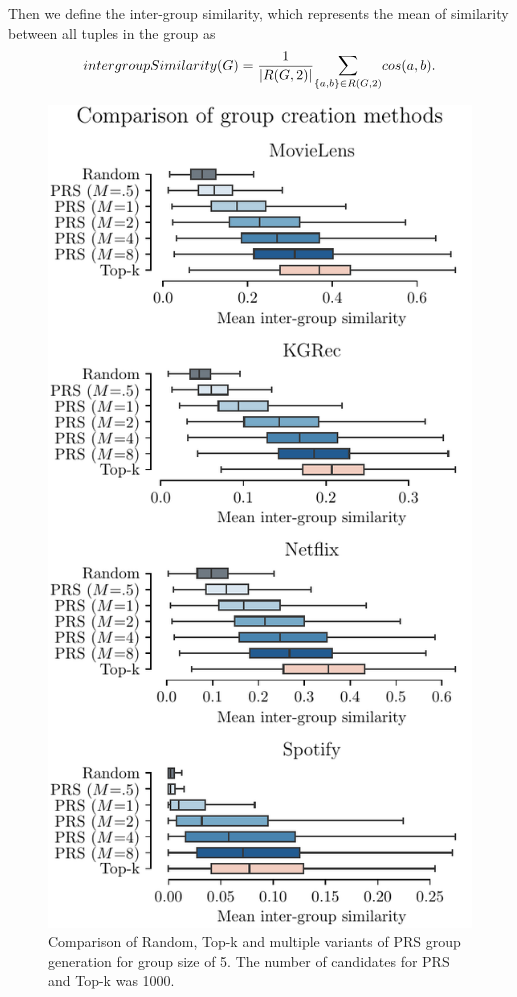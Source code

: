 Then we define the inter-group similarity, which represents the mean of similarity between all tuples in the group as
\begin{equation}
    intergroupSimilarity(G) = \frac{1}{|R(G,2)|}\mathlarger{\sum}_{\{a,b\} \in R(G,2)}  cos(a,b).
\end{equation}


\begin{figure}[ht!]
    \centering
    \includegraphics{img/figures/inter_group_means.pdf}
    \caption[Comparison of Random, Top-k and multiple variants of PRS group generation for group size of 5.]{Comparison of Random, Top-k and multiple variants of PRS group generation for group size of 5. The number of candidates for PRS and Top-k was 1000.}
    \label{fig:inter_group_means}
\end{figure}

